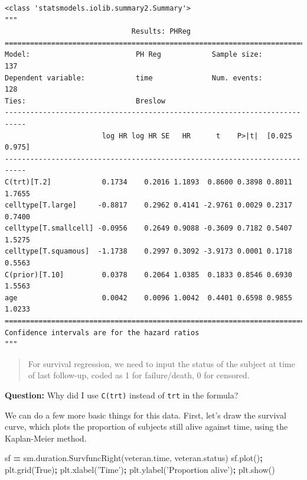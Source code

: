 \documentclass[
  letterpaper,
]{scrbook}
\newenvironment{Shaded}{\begin{snugshade}}{\end{snugshade}}
\newcommand{\NormalTok}[1]{#1}
\newcommand{\OperatorTok}[1]{\textcolor[rgb]{0.81,0.36,0.00}{\textbf{#1}}}
\newcommand{\StringTok}[1]{\textcolor[rgb]{0.31,0.60,0.02}{#1}}
\newcommand{\VariableTok}[1]{\textcolor[rgb]{0.00,0.00,0.00}{#1}}
\begin{document}
\begin{verbatim}
<class 'statsmodels.iolib.summary2.Summary'>
"""
                              Results: PHReg
===========================================================================
Model:                         PH Reg            Sample size:           137
Dependent variable:            time              Num. events:           128
Ties:                          Breslow                                     
---------------------------------------------------------------------------
                       log HR log HR SE   HR      t    P>|t|  [0.025 0.975]
---------------------------------------------------------------------------
C(trt)[T.2]            0.1734    0.2016 1.1893  0.8600 0.3898 0.8011 1.7655
celltype[T.large]     -0.8817    0.2962 0.4141 -2.9761 0.0029 0.2317 0.7400
celltype[T.smallcell] -0.0956    0.2649 0.9088 -0.3609 0.7182 0.5407 1.5275
celltype[T.squamous]  -1.1738    0.2997 0.3092 -3.9173 0.0001 0.1718 0.5563
C(prior)[T.10]         0.0378    0.2064 1.0385  0.1833 0.8546 0.6930 1.5563
age                    0.0042    0.0096 1.0042  0.4401 0.6598 0.9855 1.0233
===========================================================================
Confidence intervals are for the hazard ratios
"""
\end{verbatim}

\begin{quote}
For survival regression, we need to input the status of the subject
at time of last follow-up, coded as 1 for failure/death, 0 for censored.
\end{quote}

\textbf{Question:} Why did I use \texttt{C(trt)} instead of \texttt{trt} in the formula?

We can do a few more basic things for this data. First, let's draw the
survival curve, which plots the proportion of subjects still alive against time, using the Kaplan-Meier method.

\begin{Shaded}
\begin{Highlighting}[]
\NormalTok{sf }\OperatorTok{=}\NormalTok{ sm.duration.SurvfuncRight(veteran.time, veteran.status)}
\NormalTok{sf.plot()}\OperatorTok{;}
\NormalTok{plt.grid(}\VariableTok{True}\NormalTok{)}\OperatorTok{;}
\NormalTok{plt.xlabel(}\StringTok{'Time'}\NormalTok{)}\OperatorTok{;}
\NormalTok{plt.ylabel(}\StringTok{'Proportion alive'}\NormalTok{)}\OperatorTok{;}
\NormalTok{plt.show()}
\end{Highlighting}
\end{Shaded}
\end{document}
